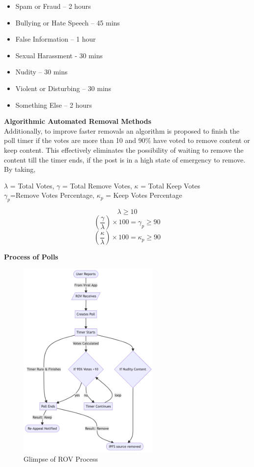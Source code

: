 \documentclass[conference]{IEEEtran}
\begin{document}
\begin{itemize}[wide, labelwidth=!, labelindent=0pt]
\item Spam or Fraud – 2 hours
\item Bullying or Hate Speech – 45 mins
\item False Information – 1 hour
\item Sexual Harassment - 30 mins
\item Nudity – 30 mins
\item Violent or Disturbing – 30 mins
\item Something Else – 2 hours
\end{itemize}

\textbf{Algorithmic Automated Removal Methods}\\

Additionally, to improve faster removals an algorithm is proposed to finish the poll timer if the votes are more than 10 and 90\% have voted to remove content or keep content. This effectively eliminates the possibility of waiting to remove the content till the timer ends, if the post is in a high state of emergency to remove. By taking,
\begin{center}
$\lambda$ = Total Votes, $\gamma$ = Total Remove Votes, $\kappa$ = Total Keep Votes \\
$\gamma_p$=Remove Votes Percentage, $\kappa_p$ = Keep Votes Percentage\\
\end{center}
\[\lambda \geq10\]
\[(\frac{\gamma}{\lambda}) \times  100 = \gamma_p \geq 90\]
\[(\frac{\kappa}{\lambda}) \times  100 = \kappa_p \geq 90\]

\textbf{Process of Polls}\\
\begin{figure}[H]
\begin{center}
\includegraphics[width=7cm]{rov-poll}
\caption{Glimpse of ROV Process}
\end{center}
\end{figure}
\end{document}
